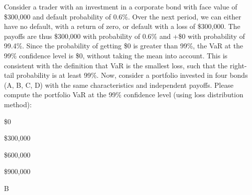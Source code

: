 \documentclass{article}
\newcounter{question} %
\begin{document}
\begin{question}
    Consider a trader with an investment in a corporate bond with face value of \$300,000 and default probability of 0.6\%. Over the next period, we can either have no default, with a return of zero, or default with a loss of \$300,000. The payoffs are thus \$300,000 with probability of 0.6\% and +\$0 with probability of 99.4\%. Since the probability of getting \$0 is greater than 99\%, the VaR at the 99\% confidence level is \$0, without taking the mean into account. This is consistent with the definition that VaR is the smallest loss, such that the right-tail probability is at least 99\%. Now, consider a portfolio invested in four bonds (A, B, C, D) with the same characteristics and independent payoffs. Please compute the portfolio VaR at the 99\% confidence level (using loss distribution method):
\end{question}

\begin{choices}
    \item \$0
    \item \$300,000
    \item \$600,000
    \item \$900,000
\end{choices}

\begin{correctanswer}
    B
\end{correctanswer}
\end{document}
